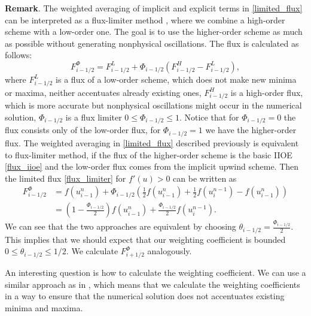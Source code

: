 \documentclass[../include.tex]{subfiles}
\begin{document}
\textbf{Remark}. The weighted averaging of implicit and explicit terms in \eqref{limited_flux} can be interpreted as a flux-limiter method \cite{lev}, where we combine a high-order scheme with a low-order one. The goal is to use the higher-order scheme as much as possible without generating nonphysical oscillations. The flux is calculated as follows:
\begin{equation}
	\label{flux_limiter}
	F^{\Phi}_{i-1/2} = F^L_{i-1/2} + \Phi_{i-1/2} (F^H_{i-1/2} - F^L_{i-1/2}),
\end{equation}
where $ F^L_{i-1/2} $ is a flux of a low-order scheme, which does not make new minima or maxima, neither accentuates already existing ones, $ F^H_{i-1/2} $ is a high-order flux, which is more accurate but nonphysical oscillations might occur in the numerical solution, $ \Phi_{i-1/2} $ is a flux limiter $ 0 \leq \Phi_{i-1/2} \leq 1 $. Notice that for $ \Phi_{i-1/2} = 0 $ the flux consists only of the low-order flux, for $ \Phi_{i-1/2} = 1 $ we have the higher-order flux.
The weighted averaging in \eqref{limited_flux} described previously is equivalent to flux-limiter method, if the flux of the  higher-order scheme is the basic IIOE \eqref{flux_iioe} and the low-order flux comes from the implicit upwind scheme. Then the limited flux \eqref{flux_limiter} for $ f'(u) > 0 $ can be written as
\begin{equation}
	\begin{split}
	F^{\Phi}_{i-1/2} &= f(u^n_{i-1}) + \Phi_{i-1/2} \left(\frac{1}{2} f(u^n_{i-1}) + \frac{1}{2} f(u^{n-1}_{i}) - f(u^n_{i-1})\right)\\
				   	 &= \left(1 - \frac{\Phi_{i-1/2}}{2}\right) f(u^n_{i-1}) + \frac{\Phi_{i-1/2}}{2} f(u^{n-1}_{i}).
	\end{split}
\end{equation}
We can see that the two approaches are equivalent by choosing $ \theta_{i-1/2} = \frac{\Phi_{i-1/2}}{2} $. This implies that we should expect that our weighting coefficient is bounded $ 0 \leq \theta_{i-1/2} \leq 1/2 $. We calculate $ F^{\Phi}_{i+1/2} $ analogously.

An interesting question is how to calculate the weighting coefficient. We can use a similar approach as in \cite{borisbook, zalesak, iioe2012, iioe2}, which means that we calculate the weighting coefficients in a way to ensure that the numerical solution does not accentuates existing minima and maxima.
\end{document}
